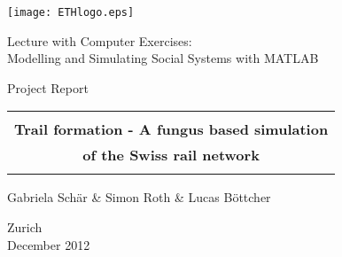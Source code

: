 
\thispagestyle{empty}

\begin{center}
\texttt{[image: ETHlogo.eps]}

\bigskip


\bigskip


\bigskip


\LARGE{ 	Lecture with Computer Exercises:\\ }
\LARGE{ Modelling and Simulating Social Systems with MATLAB\\}

\bigskip

\bigskip

\small{Project Report}\\

\bigskip

\bigskip

\bigskip

\bigskip


\begin{tabular}{|c|}
\hline
\\
\textbf{\LARGE{Trail formation - A fungus based simulation}}\\
\textbf{\LARGE{of the Swiss rail network}}\\
\\
\hline
\end{tabular}
\bigskip

\bigskip

\bigskip

\LARGE{Gabriela Schär \& Simon Roth \& Lucas Böttcher}



\bigskip

\bigskip

\bigskip

\bigskip

\bigskip

\bigskip

\bigskip

\bigskip

Zurich\\
December 2012\\

\end{center}


